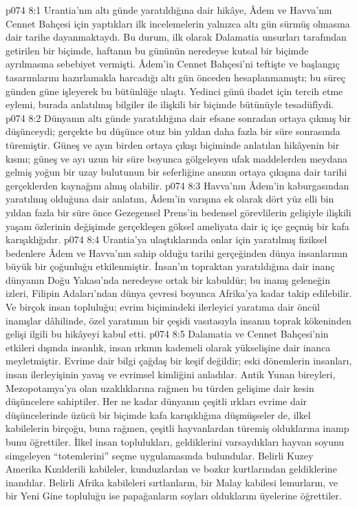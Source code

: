 \vs p074 8:1 Urantia’nın altı günde yaratıldığına dair hikâye, Âdem ve Havva’nın Cennet Bahçesi için yaptıkları ilk incelemelerin yalnızca altı gün sürmüş olmasına dair tarihe dayanmaktaydı. Bu durum, ilk olarak Dalamatia unsurları tarafından getirilen bir biçimde, haftanın bu gününün neredeyse kutsal bir biçimde ayrılmasına sebebiyet vermişti. Âdem’in Cennet Bahçesi’ni teftişte ve başlangıç tasarımlarını hazırlamakla harcadığı altı gün önceden hesaplanmamıştı; bu süreç günden güne işleyerek bu bütünlüğe ulaştı. Yedinci günü ibadet için tercih etme eylemi, burada anlatılmış bilgiler ile ilişkili bir biçimde bütünüyle tesadüfîydi.
\vs p074 8:2 Dünyanın altı günde yaratıldığına dair efsane sonradan ortaya çıkmış bir düşünceydi; gerçekte bu düşünce otuz bin yıldan daha fazla bir süre sonrasında türemiştir. Güneş ve ayın birden ortaya çıkışı biçiminde anlatılan hikâyenin bir kısmı; güneş ve ayı uzun bir süre boyunca gölgeleyen ufak maddelerden meydana gelmiş yoğun bir uzay bulutunun bir seferliğine ansızın ortaya çıkışına dair tarihi gerçeklerden kaynağını almış olabilir.
\vs p074 8:3 Havva’nın Âdem’in kaburgasından yaratılmış olduğuna dair anlatım, Âdem’in varışına ek olarak dört yüz elli bin yıldan fazla bir süre önce Gezegensel Prens’in bedensel görevlilerin gelişiyle ilişkili yaşam özlerinin değişimde gerçekleşen göksel ameliyata dair iç içe geçmiş bir kafa karışıklığıdır.
\vs p074 8:4 Urantia’ya ulaştıklarında onlar için yaratılmış fiziksel bedenlere Âdem ve Havva’nın sahip olduğu tarihi gerçeğinden dünya insanlarının büyük bir çoğunluğu etkilenmiştir. İnsan’ın topraktan yaratıldığına dair inanç dünyanın Doğu Yakası’nda neredeyse ortak bir kabuldür; bu inanış geleneğin izleri, Filipin Adaları’ndan dünya çevresi boyunca Afrika’ya kadar takip edilebilir. Ve birçok insan topluluğu; evrim biçimindeki ilerleyici yaratıma dair öncül inanışlar dâhilinde, özel yaratımın bir çeşidi vasıtasıyla insanın toprak kökeninden gelişi ilgili bu hikâyeyi kabul etti.
\vs p074 8:5 Dalamatia ve Cennet Bahçesi’nin etkileri dışında insanlık, insan ırkının kademeli olarak yükselişine dair inanca meyletmiştir. Evrime dair bilgi çağdaş bir keşif değildir; eski dönemlerin insanları, insan ilerleyişinin yavaş ve evrimsel kimliğini anladılar. Antik Yunan bireyleri, Mezopotamya’ya olan uzaklıklarına rağmen bu türden gelişime dair kesin düşüncelere sahiptiler. Her ne kadar dünyanın çeşitli ırkları evrime dair düşüncelerinde üzücü bir biçimde kafa karışıklığına düşmüşseler de, ilkel kabilelerin birçoğu, buna rağmen, çeşitli hayvanlardan türemiş olduklarına inanıp bunu öğrettiler. İlkel insan toplulukları, geldiklerini varsaydıkları hayvan soyunu simgeleyen “totemlerini” seçme uygulamasında bulundular. Belirli Kuzey Amerika Kızılderili kabileler, kunduzlardan ve bozkır kurtlarından geldiklerine inandılar. Belirli Afrika kabileleri sırtlanların, bir Malay kabilesi lemurların, ve bir Yeni Gine topluluğu ise papağanların soyları olduklarını üyelerine öğrettiler.
